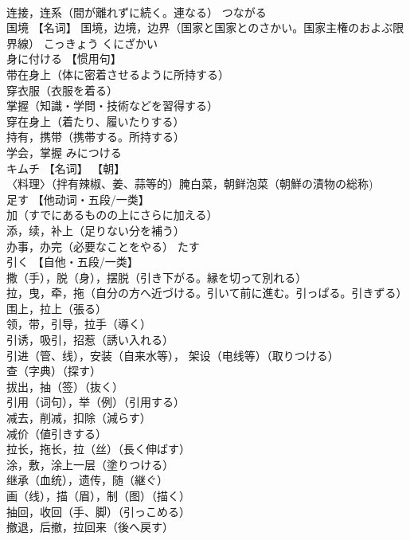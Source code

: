 \documentclass[8pt]{extreport}
\begin{document}
\begin{CJK}{UTF8}{min}
\\	连接，连系（間が離れずに続く。連なる）	つながる	
\\	国境	【名词】 国境，边境，边界（国家と国家とのさかい。国家主権のおよぶ限界線）	こっきょう くにざかい	
\\	身に付ける	【惯用句】 
\\	带在身上（体に密着させるように所持する） 
\\	穿衣服（衣服を着る） 
\\	掌握（知識・学問・技術などを習得する） 
\\	穿在身上（着たり、履いたりする） 
\\	持有，携带（携帯する。所持する） 
\\	学会，掌握	みにつける	
\\	キムチ	【名词】 【朝】
\\	〈料理〉（拌有辣椒、姜、蒜等的）腌白菜，朝鲜泡菜（朝鮮の漬物の総称)		
\\	足す	【他动词・五段/一类】 
\\	加（すでにあるものの上にさらに加える） 
\\	添，续，补上（足りない分を補う） 
\\	办事，办完（必要なことをやる）	たす	
\\	引く	【自他・五段/一类】 
\\	撒（手），脱（身），摆脱（引き下がる。縁を切って別れる） 
\\	拉，曳，牵，拖（自分の方へ近づける。引いて前に進む。引っぱる。引きずる） 
\\	围上，拉上（張る） 
\\	领，带，引导，拉手（導く） 
\\	引诱，吸引，招惹（誘い入れる） 
\\	引进（管、线），安装（自来水等）， 架设（电线等）（取りつける） 
\\	查（字典）（探す） 
\\	拔出，抽（签）（抜く） 
\\	引用（词句），举（例）（引用する） 
\\	减去，削减，扣除（減らす） 
\\	减价（値引きする） 
\\	拉长，拖长，拉（丝）（長く伸ばす） 
\\	涂，敷，涂上一层（塗りつける） 
\\	继承（血统），遗传，随（継ぐ） 
\\	画（线），描（眉），制（图）（描く） 
\\	抽回，收回（手、脚）（引っこめる） 
\\	撤退，后撤，拉回来（後へ戻す） 

\end{CJK}
\end{document}

